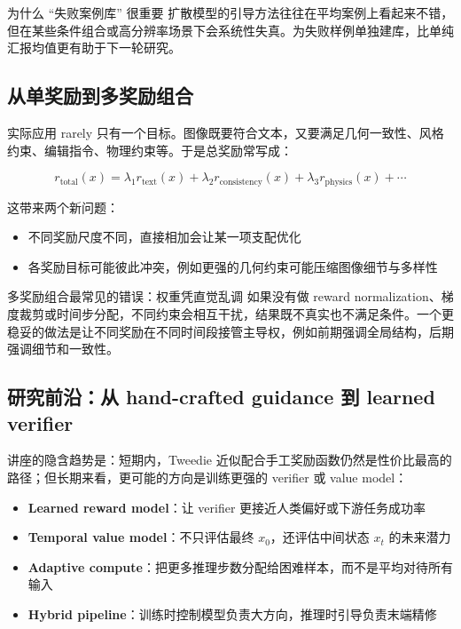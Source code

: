 \begin{knowledgebox}{为什么 ``失败案例库'' 很重要}
扩散模型的引导方法往往在平均案例上看起来不错，但在某些条件组合或高分辨率场景下会系统性失真。为失败样例单独建库，比单纯汇报均值更有助于下一轮研究。
\end{knowledgebox}

\subsection{从单奖励到多奖励组合}

实际应用 rarely 只有一个目标。图像既要符合文本，又要满足几何一致性、风格约束、编辑指令、物理约束等。于是总奖励常写成：

$$r_{\text{total}}(x) = \lambda_1 r_{\text{text}}(x) + \lambda_2 r_{\text{consistency}}(x) + \lambda_3 r_{\text{physics}}(x) + \cdots$$

这带来两个新问题：

\begin{itemize}
    \item 不同奖励尺度不同，直接相加会让某一项支配优化
    \item 各奖励目标可能彼此冲突，例如更强的几何约束可能压缩图像细节与多样性
\end{itemize}

\begin{warningbox}{多奖励组合最常见的错误：权重凭直觉乱调}
如果没有做 reward normalization、梯度裁剪或时间步分配，不同约束会相互干扰，结果既不真实也不满足条件。一个更稳妥的做法是让不同奖励在不同时间段接管主导权，例如前期强调全局结构，后期强调细节和一致性。
\end{warningbox}

\subsection{研究前沿：从 hand-crafted guidance 到 learned verifier}

讲座的隐含趋势是：短期内，Tweedie 近似配合手工奖励函数仍然是性价比最高的路径；但长期来看，更可能的方向是训练更强的 verifier 或 value model：

\begin{itemize}
    \item \textbf{Learned reward model}：让 verifier 更接近人类偏好或下游任务成功率
    \item \textbf{Temporal value model}：不只评估最终 $x_0$，还评估中间状态 $x_t$ 的未来潜力
    \item \textbf{Adaptive compute}：把更多推理步数分配给困难样本，而不是平均对待所有输入
    \item \textbf{Hybrid pipeline}：训练时控制模型负责大方向，推理时引导负责末端精修
\end{itemize}

